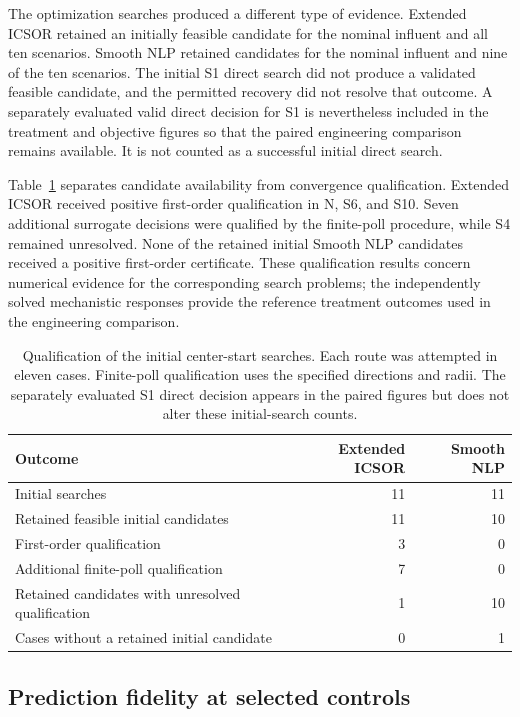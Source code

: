 The optimization searches produced a different type of evidence. Extended ICSOR retained an initially feasible candidate for the nominal influent and all ten scenarios. Smooth NLP retained candidates for the nominal influent and nine of the ten scenarios. The initial S1 direct search did not produce a validated feasible candidate, and the permitted recovery did not resolve that outcome. A separately evaluated valid direct decision for S1 is nevertheless included in the treatment and objective figures so that the paired engineering comparison remains available. It is not counted as a successful initial direct search.

Table~\ref{tab:plant_search_qualification_results} separates candidate availability from convergence qualification. Extended ICSOR received positive first-order qualification in N, S6, and S10. Seven additional surrogate decisions were qualified by the finite-poll procedure, while S4 remained unresolved. None of the retained initial Smooth NLP candidates received a positive first-order certificate. These qualification results concern numerical evidence for the corresponding search problems; the independently solved mechanistic responses provide the reference treatment outcomes used in the engineering comparison.

\begin{table}[htbp]
\centering\small
\caption{Qualification of the initial center-start searches. Each route was attempted in eleven cases. Finite-poll qualification uses the specified directions and radii. The separately evaluated S1 direct decision appears in the paired figures but does not alter these initial-search counts.}
\label{tab:plant_search_qualification_results}
\begin{tabular}{p{7.0cm}rr}
\toprule
Outcome & Extended ICSOR & Smooth NLP\\
\midrule
Initial searches & 11 & 11\\
Retained feasible initial candidates & 11 & 10\\
First-order qualification & 3 & 0\\
Additional finite-poll qualification & 7 & 0\\
Retained candidates with unresolved qualification & 1 & 10\\
Cases without a retained initial candidate & 0 & 1\\
\bottomrule
\end{tabular}
\end{table}

\subsection{Prediction fidelity at selected controls}

